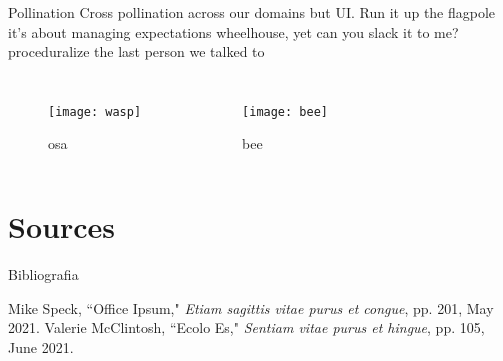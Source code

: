 \documentclass{beamer}
\begin{document}
\begin{frame}{Pollination}
Cross pollination across our domains but UI. Run it up the flagpole it's about managing expectations wheelhouse, yet can you slack it to me? proceduralize the last person we talked to
	\begin{columns}
		\begin{figure}
			\hspace*{-3cm}
			\texttt{[image: wasp]}
			\caption{osa}
		\end{figure}
		
		\begin{figure}
			\caption{bee}
			\hspace*{-2cm}
			\texttt{[image: bee]}
			
		\end{figure}
	\end{columns}
\end{frame}

\section{Sources}
\begin{frame}{Bibliografia}
\begin{thebibliography}{10}
	Mike Speck, ``Office Ipsum," \emph{Etiam sagittis vitae purus et congue}, pp. 201, May 2021.
	Valerie McClintosh, ``Ecolo Es," \emph{Sentiam vitae purus et hingue}, pp. 105, June 2021.
\end{thebibliography}
\end{frame}
\end{document}

